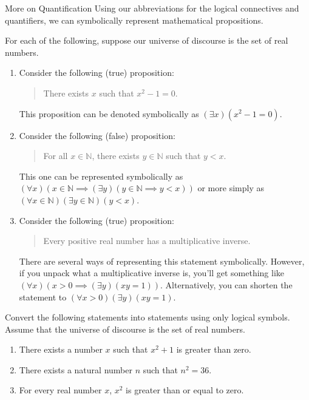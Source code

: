 \begin{section}{More on Quantification}
Using our abbreviations for the logical connectives and quantifiers, we can symbolically represent mathematical propositions.

\begin{example}
For each of the following, suppose our universe of discourse is the set of real numbers.
\begin{enumerate}

\item Consider the following (true) proposition:

\begin{quote}
There exists $x$ such that $x^2-1=0$.
\end{quote}

This proposition can be denoted symbolically as $(\exists x)(x^2-1=0)$.

\item Consider the following (false) proposition:

\begin{quote}
For all $x\in \mathbb{N}$, there exists $y\in\mathbb{N}$ such that $y<x$.
\end{quote}

This one can be represented symbolically as $(\forall x)(x\in\mathbb{N}\implies (\exists y)(y\in\mathbb{N}\implies y<x))$ or more simply as $(\forall x\in\mathbb{N})(\exists y\in\mathbb{N})(y<x)$.

\item Consider the following (true) proposition:

\begin{quote}
Every positive real number has a multiplicative inverse.
\end{quote}

There are several ways of representing this statement symbolically.  However, if you unpack what a multiplicative inverse is, you'll get something like $(\forall x)(x>0 \implies (\exists y)(xy=1))$.  Alternatively, you can shorten the statement to $(\forall x>0)(\exists y)(xy=1)$.

\end{enumerate}
\end{example}

\begin{exercise} Convert the following statements into statements using only logical symbols.  Assume that the universe of discourse is the set of real numbers.
\begin{enumerate}
\item There exists a number $x$ such that $x^2+1$ is greater than zero.
\item There exists a natural number $n$ such that $n^2=36$. 
\item For every real number $x$, $x^2$ is greater than or equal to zero.
\end{enumerate}
\end{exercise}


\end{section}
